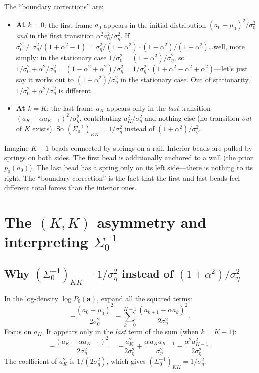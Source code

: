 \documentclass[11pt,a4paper]{article}
\newcommand{\sigeta}{\sigma_\eta^2}
\newcommand{\sigzero}{\sigma_0^2}
\begin{document}
The ``boundary corrections'' are:
\begin{itemize}[nosep]
  \item \textbf{At $k = 0$}: the first frame $a_0$ appears in the initial distribution $(a_0 - \mu_0)^2/\sigzero$ \emph{and} in the first transition $\alpha^2 a_0^2/\sigeta$.  If $\sigzero \neq \sigeta/(1+\alpha^2 - 1) = \sigeta/(1-\alpha^2) \cdot (1-\alpha^2)/(1+\alpha^2)$\ldots well, more simply: in the stationary case $1/\sigzero = (1-\alpha^2)/\sigeta$, so $1/\sigzero + \alpha^2/\sigeta = (1-\alpha^2+\alpha^2)/\sigeta = 1/\sigeta \cdot (1+\alpha^2 - \alpha^2 + \alpha^2)$---let's just say it works out to $(1+\alpha^2)/\sigeta$ in the stationary case.  Out of stationarity, $1/\sigzero + \alpha^2/\sigeta$ is different.
  \item \textbf{At $k = K$}: the last frame $a_K$ appears only in the \emph{last} transition $(a_K - \alpha a_{K-1})^2/\sigeta$, contributing $a_K^2/\sigeta$ and nothing else (no transition \emph{out} of $K$ exists).  So $(\Sigma_0^{-1})_{KK} = 1/\sigeta$ instead of $(1+\alpha^2)/\sigeta$.
\end{itemize}

\begin{intuitionbox}
Imagine $K+1$ beads connected by springs on a rail.  Interior beads are pulled by springs on both sides.  The first bead is additionally anchored to a wall (the prior $p_0(a_0)$).  The last bead has a spring only on its left side---there is nothing to its right.  The ``boundary correction'' is the fact that the first and last beads feel different total forces than the interior ones.
\end{intuitionbox}


\section{The $(K,K)$ asymmetry and interpreting $\Sigma_0^{-1}$}
\label{sec:q6}

\subsection{Why $(\Sigma_0^{-1})_{KK} = 1/\sigeta$ instead of $(1+\alpha^2)/\sigeta$}

In the log-density $\log P_0(\mathbf{a})$, expand all the squared terms:
\begin{equation}
  -\frac{(a_0 - \mu_0)^2}{2\sigzero} - \sum_{k=0}^{K-1}\frac{(a_{k+1} - \alpha a_k)^2}{2\sigeta}.
\end{equation}
Focus on $a_K$.  It appears only in the \emph{last} term of the sum (when $k = K-1$):
\begin{equation}
  -\frac{(a_K - \alpha a_{K-1})^2}{2\sigeta} = -\frac{a_K^2}{2\sigeta} + \frac{\alpha\, a_K a_{K-1}}{\sigeta} - \frac{\alpha^2 a_{K-1}^2}{2\sigeta}.
\end{equation}
The coefficient of $a_K^2$ is $1/(2\sigeta)$, which gives $(\Sigma_0^{-1})_{KK} = 1/\sigeta$.
\end{document}
